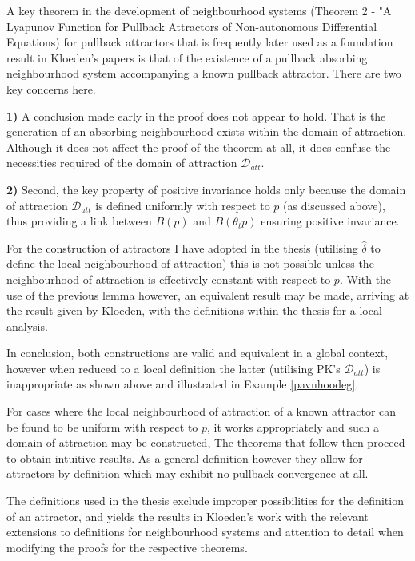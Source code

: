 \documentclass{article}
\begin{document}
A key theorem in the development of neighbourhood systems (Theorem
2 - "A Lyapunov Function for Pullback Attractors of Non-autonomous
Differential Equations) for pullback attractors that is frequently
later used as a foundation result in Kloeden's papers is that of
the existence of a pullback absorbing neighbourhood system
accompanying a known pullback attractor. There are two key
concerns here.

 \textbf{1)} A conclusion made early in the proof does not appear to hold. That
is the generation of an absorbing neighbourhood exists within the domain of
attraction. Although it does not affect the proof of the theorem at all, it does
confuse the necessities required of the domain of attraction
$\mathcal{D}_{att}$.

\textbf{2)} Second, the key property of positive invariance holds only because
the domain of attraction $\mathcal{D}_{att}$ is defined uniformly with respect
to $p$ (as discussed above), thus providing a link between $B(p)$ and
$B(\theta_t p)$ ensuring positive invariance.

For the construction of attractors I have adopted in the thesis (utilising
$\hat{\delta}$ to define the local neighbourhood of attraction) this is not
possible unless the neighbourhood of attraction is effectively
constant with respect to $p$. With the use of the previous lemma however, an
equivalent result may be made, arriving at the result given by Kloeden, with
the definitions within the thesis for a local analysis.

In conclusion, both constructions are valid and equivalent in a global
context, however when reduced to a local definition the latter
(utilising PK's $\mathcal{D}_{att}$) is inappropriate as shown above
and illustrated in Example \ref{pavnhoodeg}.

For cases where the local neighbourhood of attraction of a known attractor can
be found to be uniform with respect to $p$, it works appropriately and such a
domain of attraction may be constructed, The theorems that follow
then proceed to obtain intuitive results. As a general definition however they
allow for attractors by definition which may exhibit no pullback convergence at
all.

The definitions used in the thesis exclude improper possibilities for the
definition of an attractor, and yields the results in Kloeden's work with the
relevant extensions to definitions for neighbourhood systems and attention to
detail when modifying the proofs for the respective theorems.
\end{document}
